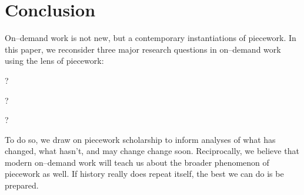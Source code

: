 \documentclass[trackingWork]{subfiles}
\begin{document}
\section{Conclusion}
On--demand work is not new, but a contemporary instantiations of piecework.
In this paper, we reconsider three major research questions in on--demand work using the lens of piecework:
\begin{inlinelist}
  \item {}?
  \item {}?
  \item {}?
\end{inlinelist}
To do so, we draw on piecework scholarship to inform analyses of what has changed, what hasn't, and may change change soon.
Reciprocally, we believe that modern on--demand work will teach us about the broader phenomenon of piecework as well.
If history really does repeat itself, the best we can do is be prepared.
\end{document}
